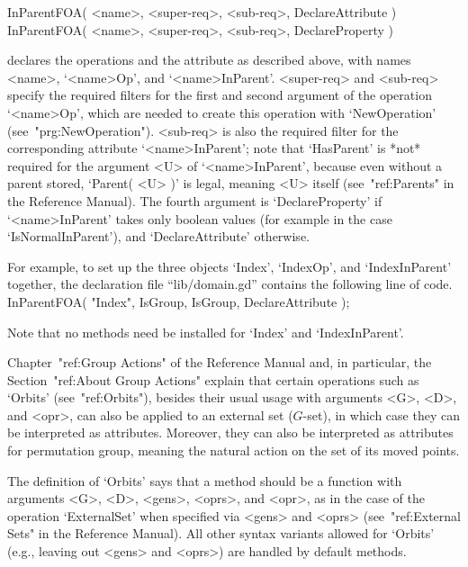 \>InParentFOA( <name>, <super-req>, <sub-req>, DeclareAttribute )
\>InParentFOA( <name>, <super-req>, <sub-req>, DeclareProperty )

declares the operations and the attribute as described above,
with names <name>, `<name>Op', and `<name>InParent'.
<super-req> and <sub-req> specify the required filters for the first and
second argument of the operation `<name>Op',
which are needed to create this operation with `NewOperation'
(see~"prg:NewOperation").
<sub-req> is also the required filter for the corresponding attribute
`<name>InParent';
note that `HasParent' is *not* required for the argument <U> of
`<name>InParent', because even without a parent stored,
`Parent( <U> )' is legal, meaning <U> itself
(see~"ref:Parents" in the Reference Manual).
The fourth argument is `DeclareProperty' if `<name>InParent' takes only
boolean values (for example in the case `IsNormalInParent'),
and `DeclareAttribute' otherwise.

For example, to set up the three objects `Index', `IndexOp',
and `IndexInParent' together,
the declaration file ``lib/domain.gd'' contains the following line of code.
\begintt
InParentFOA( "Index", IsGroup, IsGroup, DeclareAttribute );
\endtt

Note that no methods need be installed for `Index' and `IndexInParent'.



Chapter~"ref:Group Actions"  of  the  Reference Manual
and, in particular, the Section~"ref:About Group Actions"
explain that certain operations such as `Orbits' (see~"ref:Orbits"),
besides their usual usage with arguments <G>, <D>, and <opr>,
can also be applied to an external set ($G$-set),
in which case they can be interpreted as attributes.
Moreover, they can also be interpreted as attributes for permutation
group, meaning the natural action on the set of its moved points.

The definition of `Orbits' says that a method should be a function
with arguments <G>, <D>, <gens>, <oprs>, and <opr>,
as in the case of the operation `ExternalSet' when specified via <gens>
and <oprs> (see~"ref:External Sets" in the Reference Manual).
All other syntax variants allowed for `Orbits' (e.g., leaving
out <gens> and <oprs>) are handled by default methods.

